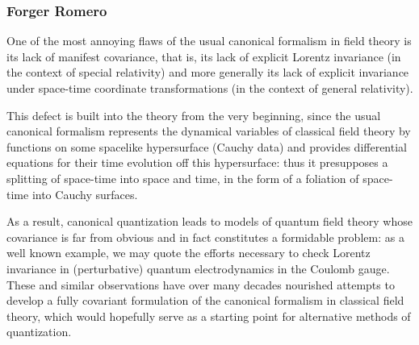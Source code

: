 \documentclass[Main]{subfiles}
\begin{document}
		\subsubsection{Forger Romero}
			One of the most annoying flaws of the usual canonical formalism in field theory is its lack of manifest covariance, that is, its lack of explicit Lorentz invariance (in the context of special relativity) and more generally its lack of explicit invariance under space-time coordinate transformations (in the context of general relativity). 
			
			This defect is built into the theory from the very beginning, since the usual canonical formalism represents the dynamical variables of classical field theory by functions on some spacelike hypersurface (Cauchy data) and provides differential equations for their time evolution off this hypersurface: thus it presupposes a splitting of space-time into space and time, in the form of a foliation of space-time into Cauchy surfaces.
			
			As a result, canonical quantization leads to models of quantum field theory whose covariance is far from obvious and in fact constitutes a formidable problem: as a well known example, we may quote the efforts necessary to check Lorentz invariance in (perturbative) quantum electrodynamics in the Coulomb gauge. \\
			These and similar observations have over many decades nourished attempts to develop a fully covariant formulation of the canonical formalism in classical field theory, which would hopefully serve as a starting point for alternative methods of quantization.
			
\end{document}
